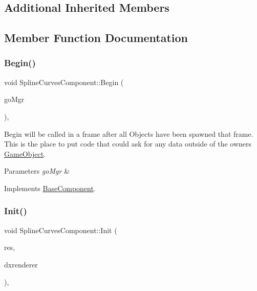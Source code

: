 \subsection*{Additional Inherited Members}


\subsection{Member Function Documentation}
\mbox{\label{classSplineCurvesComponent_abe3105f9717c863725a4cfb84b63383a}} 
\subsubsection{\texorpdfstring{Begin()}{Begin()}}
{\footnotesize\ttfamily void Spline\+Curves\+Component\+::\+Begin (\begin{DoxyParamCaption}\item[{\hyperlink{classGameObjectManager}{Game\+Object\+Manager} $\ast$}]{go\+Mgr }\end{DoxyParamCaption})\hspace{0.3cm}{\ttfamily [override]}, {\ttfamily [virtual]}}



Begin will be called in a frame after all Objects have been spawned that frame. This is the place to put code that could ask for any data outside of the owner\textquotesingle{}s \hyperlink{classGameObject}{Game\+Object}. 


\begin{DoxyParams}{Parameters}
{\em go\+Mgr} & \\
\hline
\end{DoxyParams}


Implements \hyperlink{classBaseComponent}{Base\+Component}.

\mbox{\label{classSplineCurvesComponent_ac6d31d7ca12412c0a35065a77ea956a6}} 
\subsubsection{\texorpdfstring{Init()}{Init()}}
{\footnotesize\ttfamily void Spline\+Curves\+Component\+::\+Init (\begin{DoxyParamCaption}\item[{\hyperlink{classResourceManager}{Resource\+Manager} $\ast$}]{res,  }\item[{\hyperlink{classDXRenderer}{D\+X\+Renderer} $\ast$}]{dxrenderer }\end{DoxyParamCaption})\hspace{0.3cm}{\ttfamily [override]}, {\ttfamily [virtual]}}



